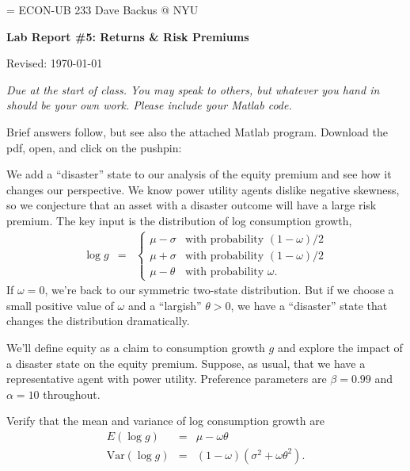 \documentclass[11pt]{exam}
\begin{document}
\parskip=\bigskipamount
\parindent=0.0in
\thispagestyle{empty}
{\large ECON-UB 233 \hfill Dave Backus @ NYU}

\bigskip\bigskip
\centerline{\Large \bf Lab Report \#5: Returns \& Risk Premiums}
\centerline{Revised: \today}

\bigskip
{\it Due at the start of class.
You may speak to others, but whatever you hand in should be your own work.
Please include your Matlab code.}

\begin{solution}
Brief answers follow,
but see also the attached Matlab program.
Download the pdf, open, and click on the pushpin:
 \\
\end{solution}

\begin{questions}
We add a ``disaster'' state to our analysis of the equity premium
and see how it changes our perspective.
We know power utility agents dislike negative skewness,
so we conjecture that an asset with a disaster outcome will
have a large risk premium.
The key input is the distribution of log consumption growth,
\begin{eqnarray*}
    \log g &=& \left\{
                \begin{array}{ll}
                \mu - \sigma & \mbox{with probability } (1-\omega)/2 \\
                \mu + \sigma & \mbox{with probability } (1-\omega)/2 \\
                \mu - \theta & \mbox{with probability } \omega .
                \end{array}
                \right.
\end{eqnarray*}
If $\omega = 0$, we're back to our symmetric two-state distribution.
But if we choose a small positive value of $\omega$ and a ``largish'' $\theta>0$,
we have a ``disaster'' state that changes the distribution dramatically.

We'll define equity as a claim to consumption growth $g$
and explore the impact of a disaster state on the equity premium.
Suppose, as usual, that we have a representative agent with power utility.
Preference parameters are $\beta = 0.99$ and $\alpha = 10$ throughout.

\begin{parts}
\item Verify that the mean and variance of log consumption growth are
\begin{eqnarray*}
    E (\log g)   &=&  \mu - \omega \theta \\
    \mbox{Var}(\log g) &=& (1-\omega) (\sigma^2 + \omega \theta^2) .
\end{eqnarray*}


\end{parts}
\end{questions}
\end{document}

